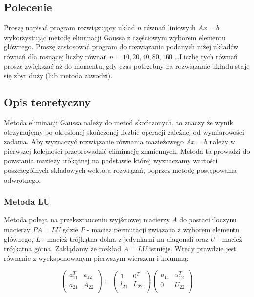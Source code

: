 \documentclass[a4paper, 11pt]{article}
\begin{document}
\subsection{Polecenie}
Proszę napisać program rozwiązujący układ $n$ równań liniowych $Ax = b$ wykorzystując metodę eliminacji Gaussa z częściowym wyborem elementu głównego. Proszę zastosować program do rozwiązania podanych niżej układów równań dla rosnącej liczby równań $n = 10, 20, 40, 80, 160$ \dots Liczbę tych równań proszę zwiększać aż do momentu, gdy czas potrzebny na rozwiązanie układu staje się zbyt duży (lub metoda zawodzi).

\subsection{Opis teoretyczny}
Metoda eliminacji Gaussa należy do metod skończonych, to znaczy że wynik otrzymujemy po określonej skończonej liczbie operacji zależnej od wymiarowości zadania. Aby wyznaczyć rozwiązanie równania mazieżowego $Ax = b$ należy w pierwszej kolejności przeprowadzić eliminację zmniennych. Metoda ta prowadzi do powstania mazieży trókątnej na podstawie której wyznaczamy wartości poszczególnych składowych wektora rozwiązań, poprzez metodę postępowania odwrotnego.~\cite{tatj}

\subsubsection{Metoda LU}
Metoda polega na przeksztauceniu wyjściowej macierzy $A$ do postaci iloczynu macierzy $PA = LU$ gdzie $P$ - macież permutacji związana z wyborem elementu głównego, $L$ - macież trójkątna dolna z jedynkami na diagonali oraz $U$ - macież trójkątna górna. Zakłądamy że rozkład $A = LU$ istnieje. Wtedy prawdzie jest równanie z wyeksponowanym pierwszym wierszem i kolumną:

$$
\left( \begin{array}{ccc}
a_{11}^T & a_{12} \\
a_{21} & A_{22} \\
\end{array} \right)
=
\left( \begin{array}{ccc}
1 & 0^T \\
l_{21} & L_{22} \\
\end{array} \right)
\left( \begin{array}{ccc}
u_{11} & u_{12}^T \\
0 & U	_{22} \\
\end{array} \right)
$$
\end{document}
